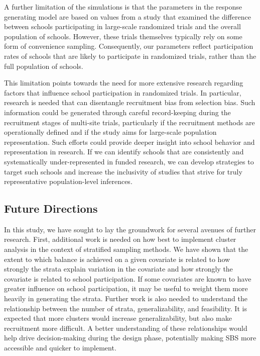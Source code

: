 \documentclass[
  english,
  man,floatsintext]{apa6}
\begin{document}
A further limitation of the simulations is that the parameters in the response generating model are based on values from a study that examined the difference between schools participating in large-scale randomized trials and the overall population of schools. However, these trials themselves typically rely on some form of convenience sampling. Consequently, our parameters reflect participation rates of schools that are likely to participate in randomized trials, rather than the full population of schools.

This limitation points towards the need for more extensive research regarding factors that influence school participation in randomized trials. In particular, research is needed that can disentangle recruitment bias from selection bias. Such information could be generated through careful record-keeping during the recruitment stages of multi-site trials, particularly if the recruitment methods are operationally defined and if the study aims for large-scale population representation.
Such efforts could provide deeper insight into school behavior and representation in research. If we can identify schools that are consistently and systematically under-represented in funded research, we can develop strategies to target such schools and increase the inclusivity of studies that strive for truly representative population-level inferences.

\hypertarget{future-directions}{%
\subsection{Future Directions}\label{future-directions}}

In this study, we have sought to lay the groundwork for several avenues of further research. First, additional work is needed on how best to implement cluster analysis in the context of stratified sampling methods. We have shown that the extent to which balance is achieved on a given covariate is related to how strongly the strata explain variation in the covariate and how strongly the covariate is related to school participation. If some covariates are known to have greater influence on school participation, it may be useful to weight them more heavily in generating the strata. Further work is also needed to understand the relationship between the number of strata, generalizability, and feasibility. It is expected that more clusters would increase generalizability, but also make recruitment more difficult. A better understanding of these relationships would help drive decision-making during the design phase, potentially making SBS more accessible and quicker to implement.
\end{document}
